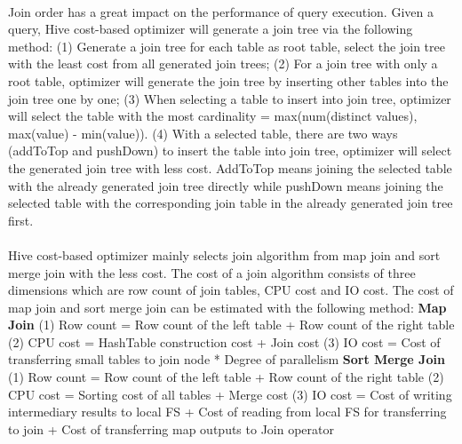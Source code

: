             \paragraph{}
            Join order has a great impact on the performance of query execution. Given a query, 
            Hive cost-based optimizer will generate a join tree via the following method:
            \newline
            (1) Generate a join tree for each table as root table, select the join tree with the least cost from all generated join trees;
            \newline
            (2) For a join tree with only a root table, optimizer will generate the join tree by inserting other tables into the join tree one by one;
            \newline
            (3) When selecting a table to insert into join tree, optimizer will select the table with the most cardinality = max(num(distinct values), max(value) 
            - min(value)).
            \newline
            (4) With a selected table, there are two ways (addToTop and pushDown) to insert the table into join tree, optimizer will select the generated join tree 
            with less cost. AddToTop means joining the selected table with the already generated join tree directly while pushDown means joining the selected 
            table with the corresponding join table in the already generated join tree first.
            \paragraph{}
            Hive cost-based optimizer mainly selects join algorithm from map join and sort merge join with the less cost. The cost of a join algorithm consists of three 
            dimensions which are row count of join tables, CPU cost and IO cost. The cost of map join and sort merge join can be estimated with the following method:
            \newline
            \newline
            \textbf{Map Join}
            \newline
            (1) Row count = Row count of the left table + Row count of the right table
            \newline
            (2) CPU cost = HashTable construction cost + Join cost
            \newline
            (3) IO cost = Cost of transferring small tables to join node * Degree of parallelism
            \newline
            \newline
            \textbf{Sort Merge Join}
            \newline
            (1) Row count = Row count of the left table + Row count of the right table
            \newline
            (2) CPU cost = Sorting cost of all tables + Merge cost
            \newline
            (3) IO cost = Cost of writing intermediary results to local FS + Cost of reading from local FS for transferring to join + Cost of transferring 
            map outputs to Join operator
    
